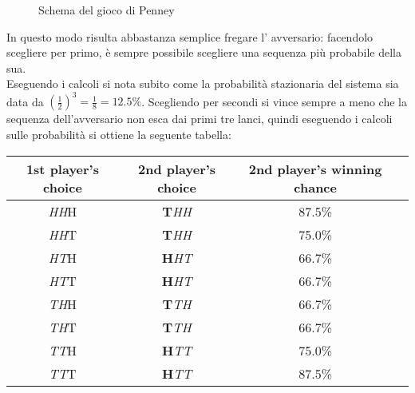 \documentclass[12pt, a4paper]{article}
\theoremstyle{theorem}
\begin{document}
\begin{figure}
\begin{tikzpicture}[x=0.75pt,y=0.75pt,yscale=-1,xscale=1]
				\end{tikzpicture}
				\caption{Schema del gioco di Penney}
				\label{Penney's scheme}
			\end{figure}
			In questo modo risulta abbastanza semplice fregare l' avversario: facendolo scegliere per primo, è sempre possibile scegliere una sequenza più probabile della sua.\\
			Eseguendo i calcoli si nota subito come la probabilità stazionaria del sistema sia data da $\left(\frac{1}{2}\right)^3=\frac{1}{8}=12.5\%$.
			Scegliendo per secondi si vince sempre a meno che la sequenza dell'avversario non esca dai primi tre lanci, quindi eseguendo i calcoli sulle probabilità si ottiene la seguente tabella:
			\begin{center}
				\begin{tabular}{ |c|c|c|c| } 
					\hline
					1st player's choice& 2nd player's choice & 2nd player's winning chance\\
					\hline
					\emph{HH}H & \textbf{T}\emph{HH} & 87.5\% \\
					\emph{HH}T & \textbf{T}\emph{HH} & 75.0\% \\
					\emph{HT}H & \textbf{H}\emph{HT} & 66.7\% \\
					\emph{HT}T & \textbf{H}\emph{HT} & 66.7\% \\
					\emph{TH}H & \textbf{T}\emph{TH} & 66.7\% \\
					\emph{TH}T & \textbf{T}\emph{TH} & 66.7\% \\
					\emph{TT}H & \textbf{H}\emph{TT} & 75.0\% \\
					\emph{TT}T & \textbf{H}\emph{TT} & 87.5\% \\
					\hline
				\end{tabular}
			\end{center}
\end{document}
